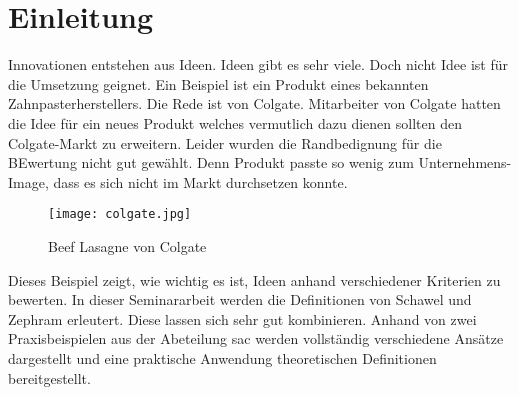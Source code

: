 \section{Einleitung}\label{sec:einleitung}
Innovationen entstehen aus Ideen. Ideen gibt es sehr viele. Doch nicht Idee ist für die Umsetzung geignet. 
Ein Beispiel ist ein Produkt eines bekannten Zahnpasterherstellers. Die Rede ist von Colgate. 
Mitarbeiter von Colgate hatten die Idee für ein neues Produkt welches vermutlich dazu dienen sollten den Colgate-Markt zu 
erweitern. Leider wurden die Randbedignung für die BEwertung nicht gut gewählt. Denn Produkt passte so wenig zum Unternehmens-Image, dass 
es sich nicht im Markt durchsetzen konnte. 
\begin{figure}[ht]
	\centering
	\texttt{[image: colgate.jpg]}
	\caption{Beef Lasagne von Colgate}
	\label{img:colgate}
\end{figure}
Dieses Beispiel zeigt, wie wichtig es ist, Ideen anhand verschiedener Kriterien zu bewerten. 
In dieser Seminararbeit werden die Definitionen von Schawel und Zephram erleutert. Diese lassen sich sehr gut kombinieren. 
Anhand von zwei Praxisbeispielen aus der Abeteilung \ac{sac} werden vollständig verschiedene Ansätze dargestellt und eine 
praktische Anwendung theoretischen Definitionen bereitgestellt. 
